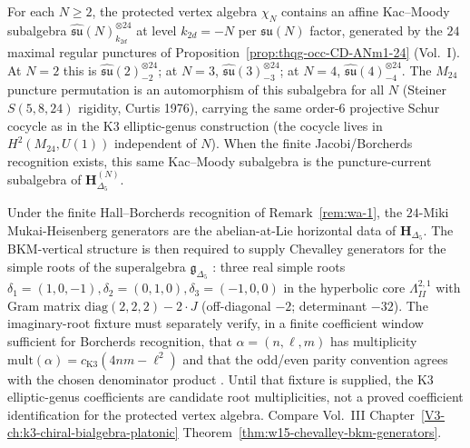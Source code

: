 \begin{remark}
\label{rem:wa-kmN}
For each $N \ge 2$, the protected vertex algebra $\chi_N$ contains an
affine Kac--Moody subalgebra
$\widehat{\mathfrak{su}}(N)_{k_{2d}}^{\otimes 24}$ at level
$k_{2d} = -N$ per $\mathfrak{su}(N)$ factor, generated by the
$24$ maximal regular punctures of
Proposition~\ref{prop:thqg-occ-CD-ANm1-24} (Vol.~I). At $N = 2$
this is $\widehat{\mathfrak{su}}(2)_{-2}^{\otimes 24}$;
at $N = 3$, $\widehat{\mathfrak{su}}(3)_{-3}^{\otimes 24}$;
at $N = 4$, $\widehat{\mathfrak{su}}(4)_{-4}^{\otimes 24}$. The
$M_{24}$ puncture permutation is an automorphism of this
subalgebra for all $N$ (Steiner $S(5, 8, 24)$ rigidity,
Curtis 1976), carrying the same order-$6$ projective Schur
cocycle as in the K3 elliptic-genus construction (the cocycle lives in
$H^2(M_{24}, U(1))$ independent of $N$).
When the finite Jacobi/Borcherds recognition exists, this same
Kac--Moody subalgebra is the puncture-current subalgebra of
$\mathbf H^{(N)}_{\Delta_5}$.
\end{remark}


\begin{remark}
\label{rem:wa-3-supplement}
Under the finite Hall--Borcherds recognition of
Remark~\ref{rem:wa-1}, the $24$-Miki Mukai-Heisenberg generators are the
abelian-at-Lie horizontal data of $\mathbf H_{\Delta_5}$. The
BKM-vertical structure is then required to supply Chevalley generators
for the simple roots of the superalgebra $\mathfrak g_{\Delta_5}$
\cite{GritsenkoNikulin1998}: three real simple roots
$\delta_1=(1,0,-1), \delta_2=(0,1,0), \delta_3=(-1,0,0)$ in the
hyperbolic core $\Lambda^{2,1}_{II}$ with Gram matrix
$\mathrm{diag}(2,2,2)-2\cdot J$ (off-diagonal $-2$; determinant $-32$).
The imaginary-root fixture must separately verify, in a finite
coefficient window sufficient for Borcherds recognition, that
$\alpha=(n,\ell,m)$ has multiplicity
$\mathrm{mult}(\alpha)=c_{\mathrm{K3}}(4nm-\ell^2)$ and that the
odd/even parity convention agrees with the chosen denominator product
\cite{EguchiOoguriTachikawa2011}. Until that fixture is supplied, the
K3 elliptic-genus coefficients are candidate root multiplicities, not a
proved coefficient identification for the protected vertex algebra.
Compare Vol.~III Chapter~\ref{V3-ch:k3-chiral-bialgebra-platonic}
Theorem~\ref{thm:w15-chevalley-bkm-generators}.
\end{remark}

